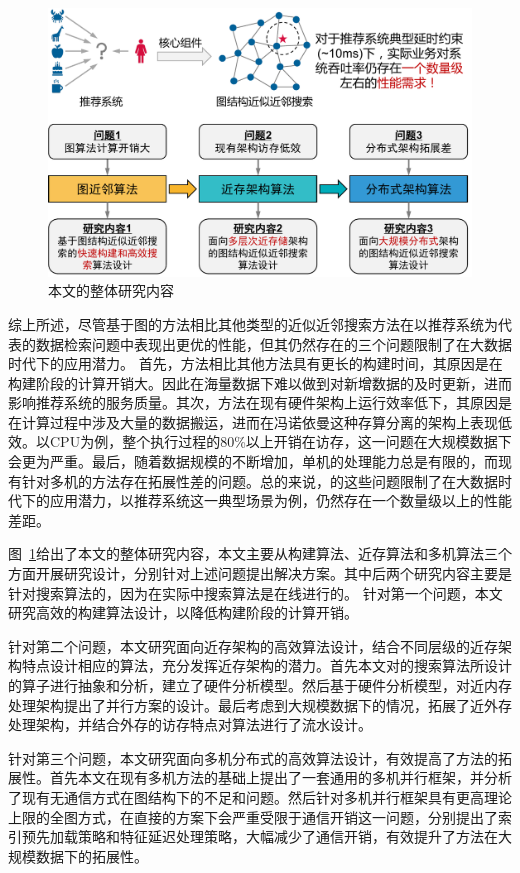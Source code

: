 \begin{figure}
  \centering
  \includegraphics[width=0.7\linewidth]{figures/Introduction/overview.pdf}
  \caption{本文的整体研究内容}
  \label{fig:overview}
\end{figure}

综上所述，尽管基于图的方法相比其他类型的近似近邻搜索方法在以推荐系统为代表的数据检索问题中表现出更优的性能，但其仍然存在的三个问题限制了在大数据时代下的应用潜力。
首先，\ganns 方法相比其他方法具有更长的构建时间\cite{dpg-2019}，其原因是在构建阶段的计算开销大。因此在海量数据下难以做到对新增数据的及时更新，进而影响推荐系统的服务质量。其次，\ganns 方法在现有硬件架构上运行效率低下，其原因是\ganns 在计算过程中涉及大量的数据搬运，进而在冯诺依曼这种存算分离的架构上表现低效。以CPU为例，整个执行过程的80\%以上开销在访存，这一问题在大规模数据下会更为严重。最后，随着数据规模的不断增加，单机的处理能力总是有限的，而现有针对多机的\ganns 方法存在拓展性差的问题。总的来说，\ganns 的这些问题限制了在大数据时代下的应用潜力，以推荐系统这一典型场景为例，仍然存在一个数量级以上的性能差距。

图~\ref{fig:overview}给出了本文的整体研究内容，本文主要从构建算法、近存算法和多机算法三个方面开展研究设计，分别针对上述问题提出解决方案。其中后两个研究内容主要是针对搜索算法的，因为在实际中搜索算法是在线进行的。
针对第一个问题，本文研究高效的构建算法设计，以降低构建阶段的计算开销。

针对第二个问题，本文研究面向近存架构的高效算法设计，结合不同层级的近存架构特点设计相应的算法，充分发挥近存架构的潜力。首先本文对\ganns 的搜索算法所设计的算子进行抽象和分析，建立了硬件分析模型。然后基于硬件分析模型，对近内存处理架构提出了并行方案的设计。最后考虑到大规模数据下的情况，拓展了近外存处理架构，并结合外存的访存特点对算法进行了流水设计。

针对第三个问题，本文研究面向多机分布式的高效算法设计，有效提高了\ganns 方法的拓展性。首先本文在现有多机方法的基础上提出了一套通用的多机并行框架，并分析了现有无通信方式在图结构下的不足和问题。然后针对多机并行框架具有更高理论上限的全图方式，在直接的方案下会严重受限于通信开销这一问题，分别提出了索引预先加载策略和特征延迟处理策略，大幅减少了通信开销，有效提升了\ganns 方法在大规模数据下的拓展性。

